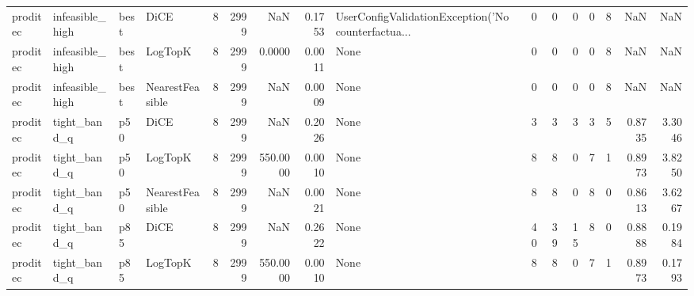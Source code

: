 \begin{tabular}{llllrrrrlrrrrrrr}
proditec &      infeasible\_high &   best &            DiCE &            8 &                 2999 &                      NaN &      0.1753 & UserConfigValidationException('No counterfactua... &      0 &            0 &        0 &              0 &          8 &                NaN &            NaN \\
proditec &      infeasible\_high &   best &         LogTopK &            8 &                 2999 &                   0.0000 &      0.0011 &                                               None &      0 &            0 &        0 &              0 &          8 &                NaN &            NaN \\
proditec &      infeasible\_high &   best & NearestFeasible &            8 &                 2999 &                      NaN &      0.0009 &                                               None &      0 &            0 &        0 &              0 &          8 &                NaN &            NaN \\
proditec &         tight\_band\_q &    p50 &            DiCE &            8 &                 2999 &                      NaN &      0.2026 &                                               None &      3 &            3 &        3 &              3 &          5 &             0.8735 &         3.3046 \\
proditec &         tight\_band\_q &    p50 &         LogTopK &            8 &                 2999 &                 550.0000 &      0.0010 &                                               None &      8 &            8 &        0 &              7 &          1 &             0.8973 &         3.8250 \\
proditec &         tight\_band\_q &    p50 & NearestFeasible &            8 &                 2999 &                      NaN &      0.0021 &                                               None &      8 &            8 &        0 &              8 &          0 &             0.8613 &         3.6267 \\
proditec &         tight\_band\_q &    p85 &            DiCE &            8 &                 2999 &                      NaN &      0.2622 &                                               None &     40 &           39 &       15 &              8 &          0 &             0.8888 &         0.1984 \\
proditec &         tight\_band\_q &    p85 &         LogTopK &            8 &                 2999 &                 550.0000 &      0.0010 &                                               None &      8 &            8 &        0 &              7 &          1 &             0.8973 &         0.1793 \\

\end{tabular}
